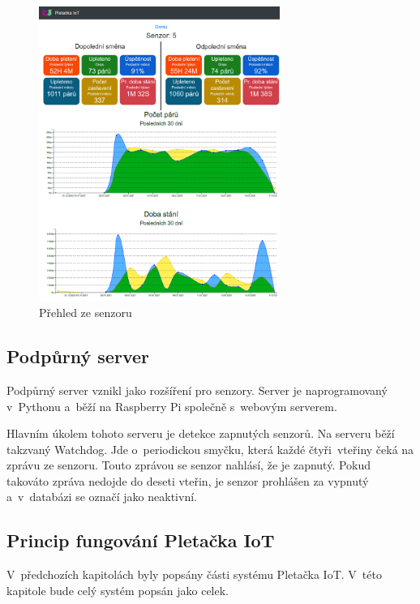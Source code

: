 \documentclass[12pt, a4paper]{article}
\begin{document}
\begin{figure}[t]
    \centering
    \includegraphics[width=0.7\textwidth]{img/prehled.png}
    \caption{Přehled ze senzoru}
    \label{fig:webSenzory}
\end{figure}


\subsection*{Podpůrný server}
Podpůrný server vznikl jako rozšíření pro senzory.
Server je naprogramovaný v~Pythonu a~běží na Raspberry Pi společně s~webovým serverem.\newline

Hlavním úkolem tohoto serveru je detekce zapnutých senzorů.
Na serveru běží takzvaný Watchdog.
Jde o~periodickou smyčku, která každé čtyři~vteřiny čeká na zprávu ze senzoru.
Touto zprávou se senzor nahlásí, že je zapnutý. Pokud takováto zpráva nedojde do deseti vteřin, je senzor prohlášen za vypnutý a~v~databázi se označí jako neaktivní.



\subsection*{Princip fungování Pletačka IoT}
V~předchozích kapitolách byly popsány části systému Pletačka IoT.
V~této kapitole bude celý systém popsán jako celek.
\end{document}
